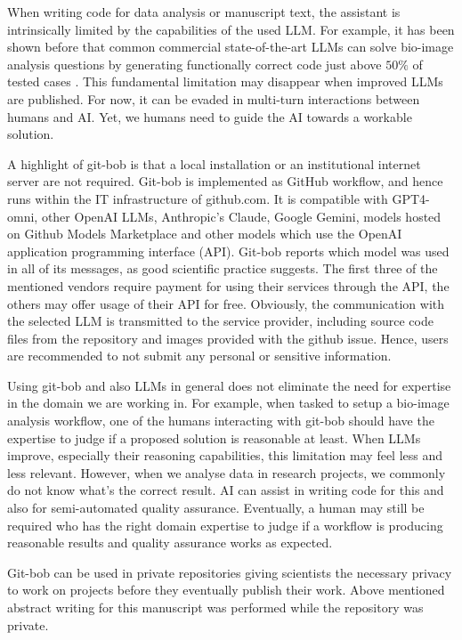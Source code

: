 \documentclass{ecai}
\begin{document}
When writing code for data analysis or manuscript text, the assistant is intrinsically limited by the capabilities of the used LLM. For example, it has been shown before that common commercial state-of-the-art LLMs can solve bio-image analysis questions by generating functionally correct code just above $50\%$ of tested cases \citep{benchmark_llm_bia}. This fundamental limitation may disappear when improved LLMs are published. For now, it can be evaded in multi-turn interactions between humans and AI. Yet, we humans need to guide the AI towards a workable solution. 

A highlight of git-bob is that a local installation or an institutional internet server are not required. Git-bob is implemented as GitHub workflow, and hence runs within the IT infrastructure of github.com. It is compatible with GPT4-omni, other OpenAI LLMs, Anthropic's Claude, Google Gemini, models hosted on Github Models Marketplace and other models which use the OpenAI application programming interface (API). Git-bob reports which model was used in all of its messages, as good scientific practice suggests. The first three of the mentioned vendors require payment for using their services through the API, the others may offer usage of their API for free. Obviously, the communication with the selected LLM is transmitted to the service provider, including source code files from the repository and images provided with the github issue. Hence, users are recommended to not submit any personal or sensitive information. 

Using git-bob and also LLMs in general does not eliminate the need for expertise in the domain we are working in. For example, when tasked to setup a bio-image analysis workflow, one of the humans interacting with git-bob should have the expertise to judge if a proposed solution is reasonable at least. When LLMs improve, especially their reasoning capabilities, this limitation may feel less and less relevant. However, when we analyse data in research projects, we commonly do not know what's the correct result. AI can assist in writing code for this and also for semi-automated quality assurance. Eventually, a human may still be required who has the right domain expertise to judge if a workflow is producing reasonable results and quality assurance works as expected.

Git-bob can be used in private repositories giving scientists the necessary privacy to work on projects before they eventually publish their work. Above mentioned abstract writing for this manuscript was performed while the repository was private.
\end{document}
